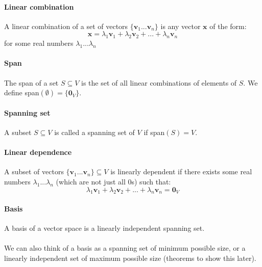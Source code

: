 \documentclass{scrartcl}
\renewcommand{\vec}[1]{\mathbf{#1}}
\begin{document}
\paragraph{Linear combination}
A linear combination of a set of vectors $ \{\vec{v}_{1}...\vec{v}_{n}\} $ is any vector $ \vec{x} $ of the form:
\begin{equation}
\vec{x} = \lambda_{1}\vec{v}_{1} + \lambda_{2}\vec{v}_{2} + ... + \lambda_{n}\vec{v}_{n}
\end{equation}
for some real numbers $ \lambda_{1}...\lambda_{n} $

\paragraph{Span}
The span of a set $ S \subseteq V $ is the set of all linear combinations of elements of $ S $. We define span$ (\emptyset) = \{\vec{0}_{V}\} $.

\paragraph{Spanning set}
A subset $ S \subseteq V $ is called a spanning set of $ V $ if span$ (S) = V $.

\paragraph{Linear dependence}
A subset of vectors $ \{ \vec{v}_{1}...\vec{v}_{n} \}  \subseteq V $ is linearly dependent if there exists some real numbers $ \lambda_{1}...\lambda_{n} $ (which are not just all $ 0 $s) such that:
\begin{equation}
\lambda_{1}\vec{v}_{1} + \lambda_{2}\vec{v}_{2} + ... + \lambda_{n}\vec{v}_{n} = \vec{0}_{V}
\end{equation}

\paragraph{Basis}
A basis of a vector space is a linearly independent spanning set.
\\\\
We can also think of a basis as a spanning set of minimum possible size, or a linearly independent set of maximum possible size (theorems to show this later).
\end{document}
